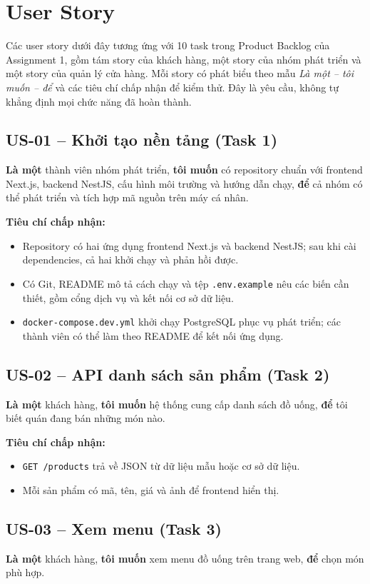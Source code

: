 \section{User Story}

Các user story dưới đây tương ứng với 10 task trong Product Backlog của Assignment 1, gồm tám story của khách hàng, một story của nhóm phát triển và một story của quản lý cửa hàng. Mỗi story có phát biểu theo mẫu \emph{Là một -- tôi muốn -- để} và các tiêu chí chấp nhận để kiểm thử. Đây là yêu cầu, không tự khẳng định mọi chức năng đã hoàn thành.

\subsection*{US-01 -- Khởi tạo nền tảng (Task 1)}
\textbf{Là một} thành viên nhóm phát triển, \textbf{tôi muốn} có repository chuẩn với frontend Next.js, backend NestJS, cấu hình môi trường và hướng dẫn chạy, \textbf{để} cả nhóm có thể phát triển và tích hợp mã nguồn trên máy cá nhân.

\textbf{Tiêu chí chấp nhận:}
\begin{itemize}
  \item Repository có hai ứng dụng frontend Next.js và backend NestJS; sau khi cài dependencies, cả hai khởi chạy và phản hồi được.
  \item Có Git, README mô tả cách chạy và tệp \texttt{.env.example} nêu các biến cần thiết, gồm cổng dịch vụ và kết nối cơ sở dữ liệu.
  \item \texttt{docker-compose.dev.yml} khởi chạy PostgreSQL phục vụ phát triển; các thành viên có thể làm theo README để kết nối ứng dụng.
\end{itemize}

\subsection*{US-02 -- API danh sách sản phẩm (Task 2)}
\textbf{Là một} khách hàng, \textbf{tôi muốn} hệ thống cung cấp danh sách đồ uống, \textbf{để} tôi biết quán đang bán những món nào.

\textbf{Tiêu chí chấp nhận:}
\begin{itemize}
  \item \texttt{GET /products} trả về JSON từ dữ liệu mẫu hoặc cơ sở dữ liệu.
  \item Mỗi sản phẩm có mã, tên, giá và ảnh để frontend hiển thị.
\end{itemize}

\subsection*{US-03 -- Xem menu (Task 3)}
\textbf{Là một} khách hàng, \textbf{tôi muốn} xem menu đồ uống trên trang web, \textbf{để} chọn món phù hợp.

